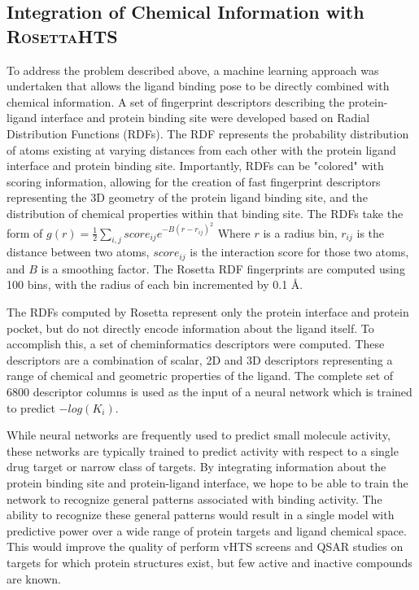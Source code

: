 \documentclass[11pt, oneside]{article}   	%
\newcommand{\rhts}{\textsc{RosettaHTS}\ }
\begin{document}
\subsection{Integration of Chemical Information with \rhts}
To address the problem described above, a machine learning approach was undertaken that allows the ligand binding pose to be directly combined with chemical information.
A set of fingerprint descriptors describing the protein-ligand interface and protein binding site were developed based on Radial Distribution Functions (RDFs).  
The RDF represents the probability distribution of atoms existing at varying distances from each other with the protein ligand interface and protein binding site.  
Importantly, RDFs can be "colored" with scoring information, allowing for the creation of fast fingerprint descriptors representing the 3D geometry of the protein ligand binding site, and the distribution of chemical properties within that binding site.  
The RDFs take the form of $g(r) =\frac{1}{2}\sum\limits_{i,j}score_{ij}e^{-B(r-r_{ij})^2}$ Where $r$ is a radius bin, $r_{ij}$ is the distance between two atoms, $score_{ij}$ is the interaction score for those two atoms, and $B$ is a smoothing factor.  
The Rosetta RDF fingerprints are computed using 100 bins, with the radius of each bin incremented by 0.1 \AA.  

The RDFs computed by Rosetta represent only the protein interface and protein pocket, but do not directly encode information about the ligand itself.  
To accomplish this, a set of cheminformatics descriptors\citep{Mueller:2012gn} were computed. 
These descriptors are a combination of scalar, 2D and 3D descriptors representing a range of chemical and geometric properties of the ligand. 
The complete set of 6800 descriptor columns is used as the input of a neural network which is trained to predict $-log(K_{i})$. 

While neural networks are frequently used to predict small molecule activity\citep{Hecht:2008gs, Mueller:2012gn, Gohlke:2002in}, these networks are typically trained to predict activity with respect to a single drug target or narrow class of targets.  
By integrating information about the protein binding site and protein-ligand interface, we hope to be able to train the network to recognize general patterns associated with binding activity.  
The ability to recognize these general patterns would result in a single model with predictive power over a wide range of protein targets and ligand chemical space.  
This would improve the quality of perform vHTS screens and QSAR studies on targets for which protein structures exist, but few active and inactive compounds are known. 
\end{document}
